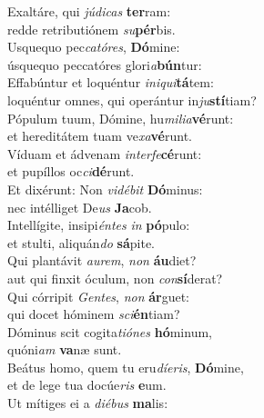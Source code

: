 \evenverse Exaltáre, qui \textit{jú}\textit{di}\textit{cas} \textbf{ter}ram:~\*\\
\evenverse redde retributiónem \textit{su}\textbf{pér}bis.\\
\oddverse Usquequo pec\textit{ca}\textit{tó}\textit{res}, \textbf{Dó}mine:~\*\\
\oddverse úsquequo peccatóres glori\textit{a}\textbf{bún}tur:\\
\evenverse Effabúntur et loquéntur \textit{i}\textit{ni}\textit{qui}\textbf{tá}tem:~\*\\
\evenverse loquéntur omnes, qui operántur in\textit{ju}\textbf{stí}tiam?\\
\oddverse Pópulum tuum, Dómine, hu\textit{mi}\textit{li}\textit{a}\textbf{vé}runt:~\*\\
\oddverse et hereditátem tuam ve\textit{xa}\textbf{vé}runt.\\
\evenverse Víduam et ádvenam \textit{in}\textit{ter}\textit{fe}\textbf{cé}runt:~\*\\
\evenverse et pupíllos oc\textit{ci}\textbf{dé}runt.\\
\oddverse Et dixérunt: Non \textit{vi}\textit{dé}\textit{bit} \textbf{Dó}minus:~\*\\
\oddverse nec intélliget De\textit{us} \textbf{Ja}cob.\\
\evenverse Intellígite, insipi\textit{én}\textit{tes} \textit{in} \textbf{pó}pulo:~\*\\
\evenverse et stulti, aliquán\textit{do} \textbf{sá}pite.\\
\oddverse Qui plantávit \textit{au}\textit{rem}, \textit{non} \textbf{áu}diet?~\*\\
\oddverse aut qui finxit óculum, non \textit{con}\textbf{sí}derat?\\
\evenverse Qui córripit \textit{Gen}\textit{tes}, \textit{non} \textbf{ár}guet:~\*\\
\evenverse qui docet hóminem \textit{sci}\textbf{én}tiam?\\
\oddverse Dóminus scit cogita\textit{ti}\textit{ó}\textit{nes} \textbf{hó}minum,~\*\\
\oddverse quóni\textit{am} \textbf{va}næ sunt.\\
\evenverse Beátus homo, quem tu eru\textit{dí}\textit{e}\textit{ris}, \textbf{Dó}mine,~\*\\
\evenverse et de lege tua docúe\textit{ris} \textbf{e}um.\\
\oddverse Ut mítiges ei a \textit{di}\textit{é}\textit{bus} \textbf{ma}lis:~\*\\
